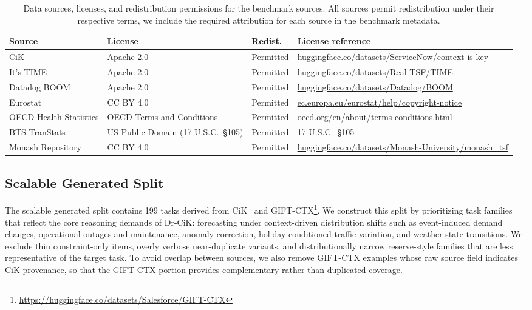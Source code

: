 \documentclass[]{servicenow}
\begin{document}
\begin{table}[t]
\centering
\footnotesize
\begin{tabular}{p{2.6cm} p{3.8cm} p{1.2cm} p{7.5cm}}
\toprule
\textbf{Source} & \textbf{License} & \textbf{Redist.} & \textbf{License reference} \\
\midrule
CiK & Apache 2.0 & Permitted & \url{huggingface.co/datasets/ServiceNow/context-is-key} \\
\addlinespace
It's TIME & Apache 2.0 & Permitted & \url{huggingface.co/datasets/Real-TSF/TIME} \\
\addlinespace
Datadog BOOM & Apache 2.0 & Permitted & \url{huggingface.co/datasets/Datadog/BOOM} \\
\addlinespace
Eurostat & CC BY 4.0 & Permitted & \url{ec.europa.eu/eurostat/help/copyright-notice} \\
\addlinespace
OECD Health Statistics & OECD Terms and Conditions & Permitted & \url{oecd.org/en/about/terms-conditions.html} \\
\addlinespace
BTS TranStats & US Public Domain (17 U.S.C.~\S105) & Permitted & 17 U.S.C.~\S105 \\
\addlinespace
Monash Repository & CC BY 4.0 & Permitted & \url{huggingface.co/datasets/Monash-University/monash_tsf} \\
\bottomrule
\end{tabular}
\vspace{5pt}
\caption{Data sources, licenses, and redistribution permissions for the benchmark sources. All sources permit redistribution under their respective terms, we include the required attribution for each source in the benchmark metadata.}
\label{tab:licenses}
\end{table}

\subsection{Scalable Generated Split}
\label{app:scalable-subset}

The scalable generated split contains 199 tasks derived from CiK~\citep{williams2024context} and GIFT-CTX\footnote{\url{https://huggingface.co/datasets/Salesforce/GIFT-CTX}}. 
We construct this split by prioritizing task families that reflect the core reasoning demands of Dr-CiK: forecasting under context-driven distribution shifts such as event-induced demand changes, operational outages and maintenance, anomaly correction, holiday-conditioned traffic variation, and weather-state transitions.
We exclude thin constraint-only items, overly verbose near-duplicate variants, and distributionally narrow reserve-style families that are less representative of the target task.
To avoid overlap between sources, we also remove GIFT-CTX examples whose raw source field indicates CiK provenance, so that the GIFT-CTX portion provides complementary rather than duplicated coverage.
\end{document}
